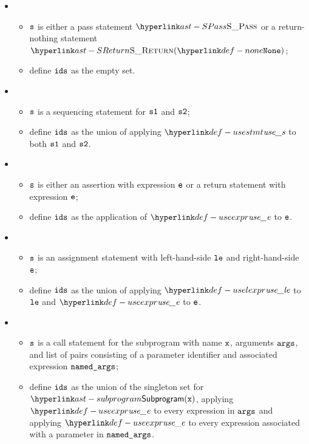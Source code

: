 \ProseParagraph
\OneApplies
\begin{itemize}
  \item {}
  \begin{itemize}
    \item $\texttt{s}$ is either a pass statement $\SPass$ or a return-nothing statement $\SReturn(\None)$;
    \item define $\texttt{ids}$ as the empty set.
  \end{itemize}

  \item {}
  \begin{itemize}
    \item $\texttt{s}$ is a sequencing statement for $\texttt{s1}$ and $\texttt{s2}$;
    \item define $\texttt{ids}$ as the union of applying $\usestmt$ to both $\texttt{s1}$ and $\texttt{s2}$.
  \end{itemize}

  \item {}
  \begin{itemize}
    \item $\texttt{s}$ is either an assertion with expression $\texttt{e}$ or a return statement with expression $\texttt{e}$;
    \item define $\texttt{ids}$ as the application of $\useexpr$ to $\texttt{e}$.
  \end{itemize}

  \item {}
  \begin{itemize}
    \item $\texttt{s}$ is an assignment statement with left-hand-side $\texttt{le}$ and right-hand-side $\texttt{e}$;
    \item define $\texttt{ids}$ as the union of applying $\uselexpr$ to $\texttt{le}$ and $\useexpr$ to $\texttt{e}$.
  \end{itemize}

  \item {}
  \begin{itemize}
    \item $\texttt{s}$ is a call statement for the subprogram with name $\texttt{x}$, arguments $\texttt{args}$, and list of
          pairs consisting of a parameter identifier and associated expression $\texttt{named\_args}$;
    \item define $\texttt{ids}$ as the union of the singleton set for $\Subprogram(\vx)$, applying $\useexpr$ to
          every expression in $\texttt{args}$ and applying $\useexpr$ to every expression associated with
          a parameter in $\texttt{named\_args}$.
  \end{itemize}


\end{itemize}
